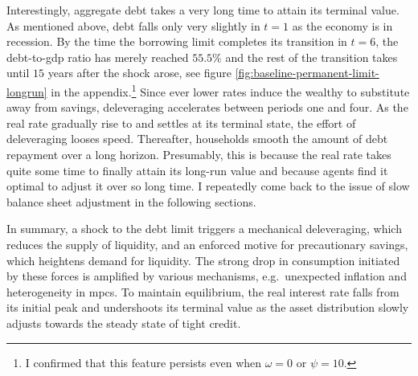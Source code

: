 \documentclass[a4paper,12pt]{article} %
\numberwithin{equation}{section} %
\numberwithin{figure}{section}
\numberwithin{table}{section}
\begin{document}
Interestingly, aggregate debt takes a very long time to attain its terminal value. As mentioned above, debt falls only very slightly in $t=1$ as the economy is in recession. By the time the borrowing limit completes its transition in $t=6$, the debt-to-\Gls{gdp} ratio has merely reached $55.5\%$ and the rest of the transition takes until $15$ years after the shock arose, see figure \ref{fig:baseline-permanent-limit-longrun} in the appendix.\footnote{I confirmed that this feature persists even when $\omega = 0$ or $\psi = 10$.} Since ever lower rates induce the wealthy to substitute away from savings, deleveraging accelerates between periods one and four. As the real rate gradually rise to and settles at its terminal state, the effort of deleveraging looses speed. Thereafter, households smooth the amount of debt repayment over a long horizon. Presumably, this is because the real rate takes quite some time to finally attain its long-run value and because agents find it optimal to adjust it over so long time. I repeatedly come back to the issue of slow balance sheet adjustment in the following sections. %

In summary, a shock to the debt limit triggers a mechanical deleveraging, which reduces the supply of liquidity, and an enforced motive for precautionary savings, which heightens demand for liquidity. The strong drop in consumption initiated by these forces is amplified by various mechanisms, e.g.~unexpected inflation and heterogeneity in \Gls{mpc}s. To maintain equilibrium, the real interest rate falls from its initial peak and undershoots its terminal value as the asset distribution slowly adjusts towards the steady state of tight credit.


\end{document}
